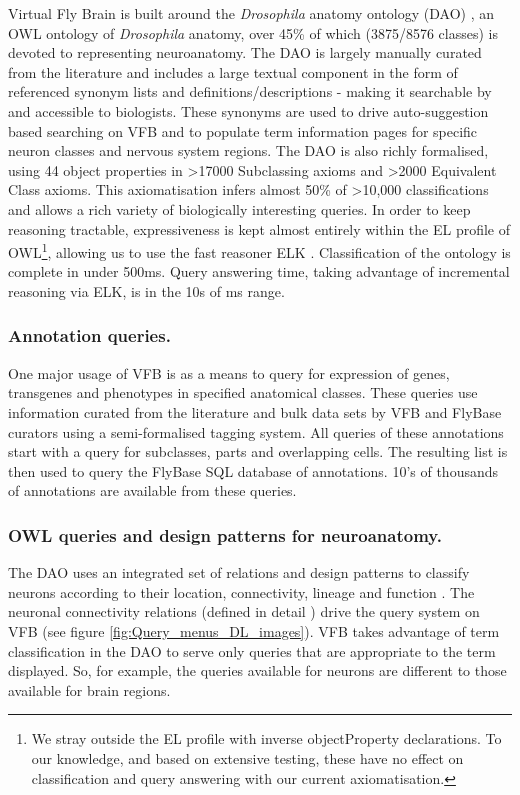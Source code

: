 \documentclass[runningheads,a4paper]{llncs}
\begin{document}
Virtual Fly Brain is built around the \textit{Drosophila} anatomy
ontology (DAO) \cite{Costa2013}, an OWL ontology of
\textit{Drosophila} anatomy, over 45\% of which (3875/8576 classes) is
devoted to representing neuroanatomy. The DAO is largely manually
curated from the literature and includes a large textual component in
the form of referenced synonym lists and definitions/descriptions -
making it searchable by and accessible to biologists.  These synonyms are used
to drive auto-suggestion based searching on VFB and to populate term
information pages for specific neuron classes and nervous system
regions. The DAO is also richly formalised, using 44 object properties
in \textgreater 17000 Subclassing axioms and \textgreater 2000
Equivalent Class axioms.  This axiomatisation infers almost 50\% of
\textgreater 10,000 classifications and allows a rich variety of
biologically interesting queries. In order to keep reasoning
tractable, expressiveness is kept almost entirely within the EL
profile of OWL\footnote{We stray outside the EL
  profile with inverse objectProperty declarations. To our
  knowledge, and based on extensive testing, these have no effect on classification and query
  answering with our current axiomatisation.}, allowing us to use the fast reasoner ELK \cite{kazakov2012elk}.
Classification of the ontology is complete in under 500ms.  Query
answering  time, taking advantage of incremental reasoning via ELK, is
in the 10s of ms range.

\subsubsection{Annotation queries.}

One major usage of VFB is as a means to query for expression of genes,
transgenes and phenotypes in specified anatomical classes.  These
queries use information curated from the literature and bulk data sets
by VFB and FlyBase curators using a semi-formalised tagging
system. All queries of these annotations start with a query for
subclasses, parts and overlapping cells.  The resulting list is then
used to query the FlyBase SQL database of annotations.  10's of
thousands of annotations are available from these queries.


\subsubsection{OWL queries and design patterns for neuroanatomy.}

The DAO uses an integrated set of relations and design patterns to
classify neurons according to their location, connectivity, lineage
and function \cite{pmid22180411,pmid22402613}.  The neuronal
connectivity relations (defined in detail \cite{pmid22402613})  drive the query system on VFB (see figure
\ref{fig:Query_menus_DL_images}). VFB takes advantage of term
classification in the DAO to serve only queries that are
appropriate to the term displayed. So, for example, the queries
available for neurons are different to those available for brain regions.
\end{document}
